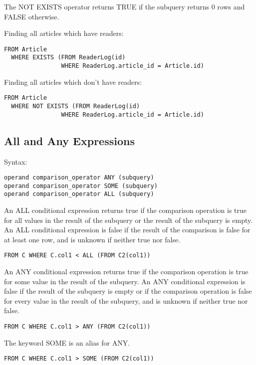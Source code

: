 \documentclass[11pt,a4paper]{report}
\begin{document}
The NOT EXISTS operator returns TRUE if the subquery returns 0 rows and FALSE otherwise.

Finding all articles which have readers:

\begin{verbatim}
FROM Article
  WHERE EXISTS (FROM ReaderLog(id)
                WHERE ReaderLog.article_id = Article.id)
\end{verbatim}

Finding all articles which don't have readers:

\begin{verbatim}
FROM Article
  WHERE NOT EXISTS (FROM ReaderLog(id)
                WHERE ReaderLog.article_id = Article.id)
\end{verbatim}

\subsection{All and Any Expressions}
Syntax:

\begin{verbatim}
operand comparison_operator ANY (subquery)
operand comparison_operator SOME (subquery)
operand comparison_operator ALL (subquery)
\end{verbatim}

An ALL conditional expression returns true if the comparison operation is true for all values in the result of the subquery or the result of the subquery is empty. An ALL conditional expression is false if the result of the comparison is false for at least one row, and is unknown if neither true nor false.

\begin{verbatim}
FROM C WHERE C.col1 < ALL (FROM C2(col1))
\end{verbatim}

An ANY conditional expression returns true if the comparison operation is true for some value in the result of the subquery. An ANY conditional expression is false if the result of the subquery is empty or if the comparison operation is false for every value in the result of the subquery, and is unknown if neither true nor false.

\begin{verbatim}
FROM C WHERE C.col1 > ANY (FROM C2(col1))
\end{verbatim}

The keyword SOME is an alias for ANY.

\begin{verbatim}
FROM C WHERE C.col1 > SOME (FROM C2(col1))
\end{verbatim}
\end{document}
